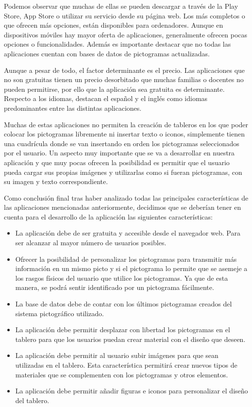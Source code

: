 Podemos observar que muchas de ellas se pueden descargar a través de la Play Store, App Store o utilizar su servicio desde su página web. Los más completos o que ofrecen más opciones, están disponibles para ordenadores. Aunque en dispositivos móviles hay mayor oferta  de aplicaciones, generalmente ofrecen pocas opciones o funcionalidades. Además es importante destacar que no todas las aplicaciones cuentan con bases de datos de pictogramas actualizadas.

Aunque a pesar de todo, el factor determinante es el precio. Las aplicaciones que no son gratuitas tienen un precio desorbitado que muchas familias o docentes no pueden permitirse, por ello que la aplicación sea gratuita es determinante. Respecto a los idiomas, destacan el español y el inglés como idiomas predominantes entre las distintas aplicaciones. 

Muchas de estas aplicaciones no permiten la creación de tableros en los que poder colocar los pictogramas libremente ni insertar texto o iconos, simplemente tienen una cuadrícula donde se van insertando en orden los pictogramas seleccionados por el usuario. Un aspecto muy importante que se va a desarrollar en nuestra aplicación y que muy pocas ofrecen la posibilidad es permitir que el usuario pueda cargar sus propias imágenes y utilizarlas como si fueran pictogramas, con su imagen y texto correspondiente.

Como conclusión final tras haber analizado todas las principales características de las aplicaciones mencionadas anteriormente, decidimos que se deberían tener en cuenta para el desarrollo de la aplicación las siguientes características:


\begin{itemize}
	\item La aplicación debe de ser gratuita y accesible desde el navegador web. Para ser alcanzar al mayor número de usuarios posibles.
	\item Ofrecer la posibilidad de personalizar los pictogramas para transmitir más información en un mismo picto y si el pictograma lo permite que se asemeje a los rasgos físicos del usuario que utilice los pictogramas. Ya que de esta manera, se podrá sentir identificado por un pictograma fácilmente. 
	\item La base de datos debe de contar con los últimos pictogramas creados del sistema pictográfico utilizado. 
	\item La aplicación debe permitir desplazar con libertad los pictogramas en el tablero para que los usuarios puedan crear material con el diseño que deseen. 
	\item La aplicación debe permitir al usuario subir imágenes para que sean utilizadas en el tablero. Esta característica permitirá crear nuevos tipos de materiales que se complementen con los pictogramas y otros elementos.
	\item La aplicación debe permitir añadir figuras e iconos para personalizar el diseño del tablero.
	
	
\end{itemize}





